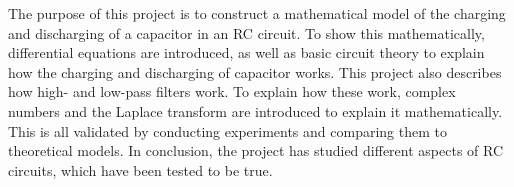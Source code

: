 The purpose of this project is to construct a mathematical model of the charging and discharging of a capacitor in an RC circuit. To show this mathematically, differential equations are introduced, as well as basic circuit theory to explain how the charging and discharging of capacitor works. This project also describes how high- and low-pass filters work. To explain how these work, complex numbers and the Laplace transform are introduced to explain it mathematically. This is all validated by conducting experiments and comparing them to theoretical models. In conclusion, the project has studied different aspects of RC circuits, which have been tested to be true. 
 

